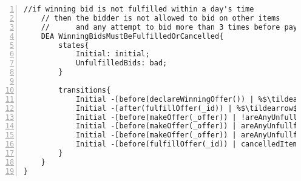 \documentclass{article}
\newcommand{\tildearrow}{{\raise.37ex\hbox{$\scriptstyle\mathtt{\sim}$}}\hspace{-0.08cm}>\xspace}
\begin{document}
\begin{lstlisting}[language=DEA,basicstyle=\scriptsize,numbers=left,numbersep=2pt,xleftmargin=0.3cm,escapechar=\%,label={dea:auctionhouse}]
    //if winning bid is not fulfilled within a day's time
    // then the bidder is not allowed to bid on other items
    //      and any attempt to bid more than 3 times before paying then the winning bid is cancelled 
    DEA WinningBidsMustBeFulfilledOrCancelled{
        states{
            Initial: initial;
            UnfulfilledBids: bad;
        }

        transitions{
            Initial -[before(declareWinningOffer()) | %$\tildearrow$% unfulfilled[currentItem] = true;]-> Initial;
            Initial -[after(fulfillOffer(_id)) | %$\tildearrow$% unfulfilled[_id] = false;]-> Initial;
            Initial -[before(makeOffer(_offer)) | !areAnyUnfullfilled(msg.sender) %$\tildearrow$% attemptsBeforeFullfillment[msg.sender] = 0;]-> Initial;
            Initial -[before(makeOffer(_offer)) | areAnyUnfullfilled(msg.sender) && attemptsBeforeFullfillment[msg.sender] < 3 %$\tildearrow$% attemptsBeforeFullfillment[msg.sender]++;]-> Initial;
            Initial -[before(makeOffer(_offer)) | areAnyUnfullfilled(msg.sender) && attemptsBeforeFullfillment[msg.sender] >= 3 %$\tildearrow$% cancelAnyUnfulfilledBids(msg.sender); return;]-> UnfulfilledBids;
            Initial -[before(fulfillOffer(_id)) | cancelledItems[_id]]-> UnfulfilledBids;
        }
    }
}
\end{lstlisting}\normalsize
\end{document}

